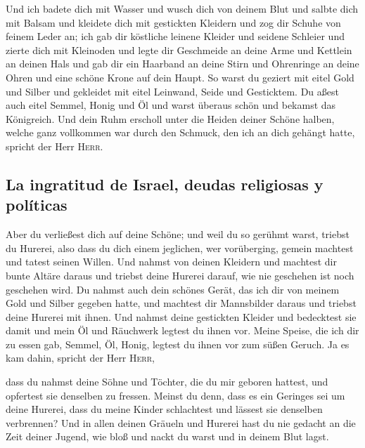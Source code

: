  Und ich badete dich mit Wasser und wusch dich von deinem
Blut und salbte dich mit Balsam  und kleidete dich mit
gestickten Kleidern und zog dir Schuhe von feinem Leder an; ich gab dir
köstliche leinene Kleider und seidene Schleier  und
zierte dich mit Kleinoden und legte dir Geschmeide an deine Arme und
Kettlein an deinen Hals  und gab dir ein Haarband an
deine Stirn und Ohrenringe an deine Ohren und eine schöne Krone auf dein
Haupt.  So warst du geziert mit eitel Gold und Silber und
gekleidet mit eitel Leinwand, Seide und Gesticktem. Du aßest auch eitel
Semmel, Honig und Öl und warst überaus schön und bekamst das Königreich.
 Und dein Ruhm erscholl unter die Heiden deiner Schöne
halben, welche ganz vollkommen war durch den Schmuck, den ich an dich
gehängt hatte, spricht der Herr \textsc{Herr}.

\hypertarget{la-ingratitud-de-israel-deudas-religiosas-y-poluxedticas}{%
\subsection{La ingratitud de Israel, deudas religiosas y
políticas}\label{la-ingratitud-de-israel-deudas-religiosas-y-poluxedticas}}

 Aber du verließest dich auf deine Schöne; und weil du so
gerühmt warst, triebst du Hurerei, also dass du dich einem jeglichen,
wer vorüberging, gemein machtest und tatest seinen Willen.
 Und nahmst von deinen Kleidern und machtest dir bunte
Altäre daraus und triebst deine Hurerei darauf, wie nie geschehen ist
noch geschehen wird.  Du nahmst auch dein schönes Gerät,
das ich dir von meinem Gold und Silber gegeben hatte, und machtest dir
Mannsbilder daraus und triebst deine Hurerei mit ihnen. 
Und nahmst deine gestickten Kleider und bedecktest sie damit und mein Öl
und Räuchwerk legtest du ihnen vor.  Meine Speise, die
ich dir zu essen gab, Semmel, Öl, Honig, legtest du ihnen vor zum süßen
Geruch. Ja es kam dahin, spricht der Herr \textsc{Herr},

 dass du nahmst deine Söhne und Töchter, die du mir
geboren hattest, und opfertest sie denselben zu fressen. Meinst du denn,
dass es ein Geringes sei um deine Hurerei,  dass du meine
Kinder schlachtest und lässest sie denselben verbrennen? 
Und in allen deinen Gräueln und Hurerei hast du nie gedacht an die Zeit
deiner Jugend, wie bloß und nackt du warst und in deinem Blut lagst.

